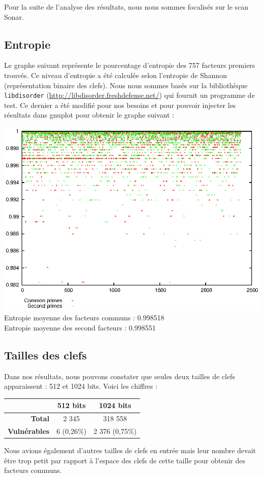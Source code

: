 \documentclass[a4paper,11pt,french]{article}
\begin{document}
Pour la suite de l'analyse des résultats, nous nous sommes focalisés sur le scan Sonar.

\subsection{Entropie}
Le graphe suivant représente le pourcentage d'entropie des 757 facteurs premiers trouvés. Ce niveau d'entropie a été calculée selon l'entropie de Shannon (représentation binaire des clefs). Nous nous sommes basés sur la bibliothèque \verb+libdisorder+ (\url{http://libdisorder.freshdefense.net/}) qui fournit un programme de test. Ce dernier a été modifié pour nos besoins et pour pouvoir injecter les résultats dans gnuplot pour obtenir le graphe suivant :

\includegraphics[width=16cm]{entropyprimes.eps}
\\
Entropie moyenne des facteurs communs : 0.998518\\
Entropie moyenne des second facteurs : 0.998551\\

\subsection{Tailles des clefs}
Dans nos résultats, nous pouvons constater que seules deux tailles de clefs apparaissent : 512 et 1024 bits. Voici les chiffres :

\begin{center}
\begin{tabular}{|r|c|c|}
\hline
\textbf{}&\textbf{512 bits}&\textbf{1024 bits}\\
\hline
\textbf{Total}&2 345&318 558\\
\hline
\textbf{Vulnérables}&6 (0,26\%)&2 376 (0,75\%)\\
\hline
\end{tabular}
\end{center}

Nous avions également d'autres tailles de clefs en entrée mais leur nombre devait être trop petit par rapport à l'espace des clefs de cette taille pour obtenir des facteurs communs.
\end{document}
